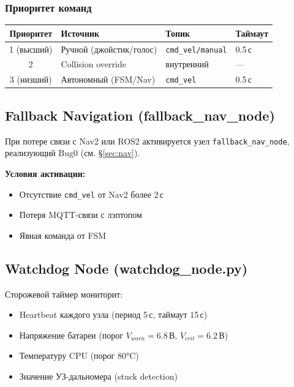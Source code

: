 \documentclass[12pt, a4paper]{article}
\begin{document}
\subsubsection{Приоритет команд}
\begin{center}
\begin{tabular}{clll}
\toprule
\textbf{Приоритет} & \textbf{Источник} & \textbf{Топик} & \textbf{Таймаут} \\
\midrule
1 (высший) & Ручной (джойстик/голос) & \texttt{cmd\_vel/manual}  & 0.5\,с \\
2          & Collision override       & внутренний                & — \\
3 (низший) & Автономный (FSM/Nav)    & \texttt{cmd\_vel}         & 0.5\,с \\
\bottomrule
\end{tabular}
\end{center}

\subsection{Fallback Navigation (fallback\_nav\_node)}

При потере связи с Nav2 или ROS2 активируется узел \texttt{fallback\_nav\_node}, реализующий Bug0 (см. \S\ref{sec:nav}).

\textbf{Условия активации:}
\begin{itemize}[noitemsep]
  \item Отсутствие \texttt{cmd\_vel} от Nav2 более 2\,с
  \item Потеря MQTT-связи с лэптопом
  \item Явная команда от FSM
\end{itemize}

\subsection{Watchdog Node (watchdog\_node.py)}

Сторожевой таймер мониторит:
\begin{itemize}[noitemsep]
  \item Heartbeat каждого узла (период 5\,с, таймаут 15\,с)
  \item Напряжение батареи (порог $V_{warn} = 6.8$\,В, $V_{crit} = 6.2$\,В)
  \item Температуру CPU (порог 80°C)
  \item Значение УЗ-дальномера (stuck detection)
\end{itemize}
\end{document}
